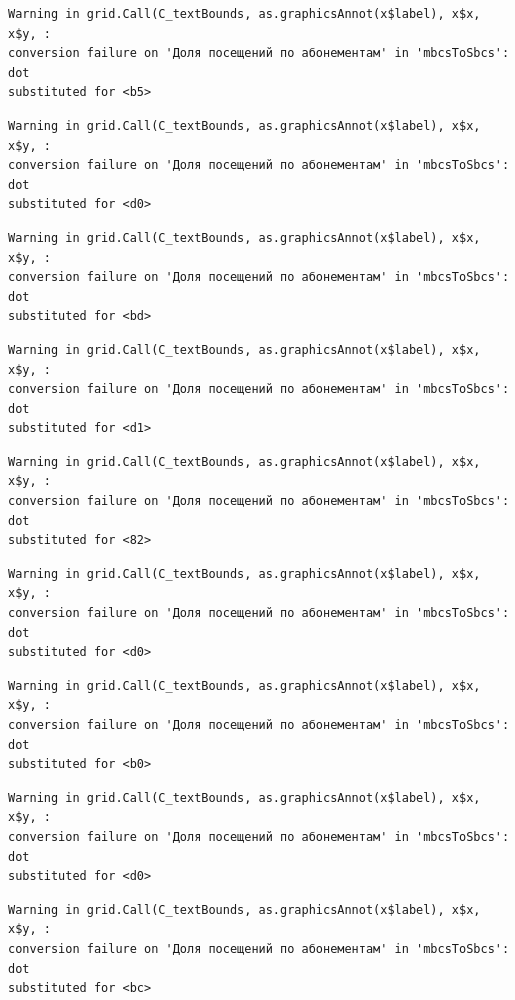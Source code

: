 \documentclass[
  letterpaper,
  DIV=11,
  numbers=noendperiod]{scrartcl}
\begin{document}
\begin{verbatim}
Warning in grid.Call(C_textBounds, as.graphicsAnnot(x$label), x$x, x$y, :
conversion failure on 'Доля посещений по абонементам' in 'mbcsToSbcs': dot
substituted for <b5>
\end{verbatim}

\begin{verbatim}
Warning in grid.Call(C_textBounds, as.graphicsAnnot(x$label), x$x, x$y, :
conversion failure on 'Доля посещений по абонементам' in 'mbcsToSbcs': dot
substituted for <d0>
\end{verbatim}

\begin{verbatim}
Warning in grid.Call(C_textBounds, as.graphicsAnnot(x$label), x$x, x$y, :
conversion failure on 'Доля посещений по абонементам' in 'mbcsToSbcs': dot
substituted for <bd>
\end{verbatim}

\begin{verbatim}
Warning in grid.Call(C_textBounds, as.graphicsAnnot(x$label), x$x, x$y, :
conversion failure on 'Доля посещений по абонементам' in 'mbcsToSbcs': dot
substituted for <d1>
\end{verbatim}

\begin{verbatim}
Warning in grid.Call(C_textBounds, as.graphicsAnnot(x$label), x$x, x$y, :
conversion failure on 'Доля посещений по абонементам' in 'mbcsToSbcs': dot
substituted for <82>
\end{verbatim}

\begin{verbatim}
Warning in grid.Call(C_textBounds, as.graphicsAnnot(x$label), x$x, x$y, :
conversion failure on 'Доля посещений по абонементам' in 'mbcsToSbcs': dot
substituted for <d0>
\end{verbatim}

\begin{verbatim}
Warning in grid.Call(C_textBounds, as.graphicsAnnot(x$label), x$x, x$y, :
conversion failure on 'Доля посещений по абонементам' in 'mbcsToSbcs': dot
substituted for <b0>
\end{verbatim}

\begin{verbatim}
Warning in grid.Call(C_textBounds, as.graphicsAnnot(x$label), x$x, x$y, :
conversion failure on 'Доля посещений по абонементам' in 'mbcsToSbcs': dot
substituted for <d0>
\end{verbatim}

\begin{verbatim}
Warning in grid.Call(C_textBounds, as.graphicsAnnot(x$label), x$x, x$y, :
conversion failure on 'Доля посещений по абонементам' in 'mbcsToSbcs': dot
substituted for <bc>
\end{verbatim}
\end{document}
